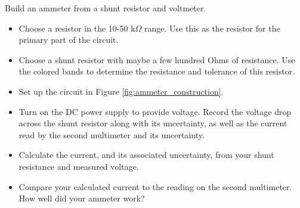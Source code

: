 \activity
{
    Build an ammeter from a shunt resistor and voltmeter.
    \begin{itemize}
        \item Choose a resistor in the 10-50 k$\Omega$ range. Use this as the
            resistor for the primary part of the circuit.
        \item Choose a shunt resistor with maybe a few hundred Ohms of 
            resistance. Use the colored bands to determine the resistance and
            tolerance of this resistor.
        \item Set up the circuit in Figure \ref{fig:ammeter_construction}.
        \item Turn on the DC power supply to provide voltage. Record the
            voltage drop across the shunt resistor along with its uncertainty,
            as well as the current
            read by the second multimeter and its uncertainty.
        \item Calculate the current, and its associated uncertainty, from
            your shunt resistance and measured voltage.
        \item Compare your calculated current to the reading on the second
            multimeter. How well did your ammeter work?
    \end{itemize}
}
